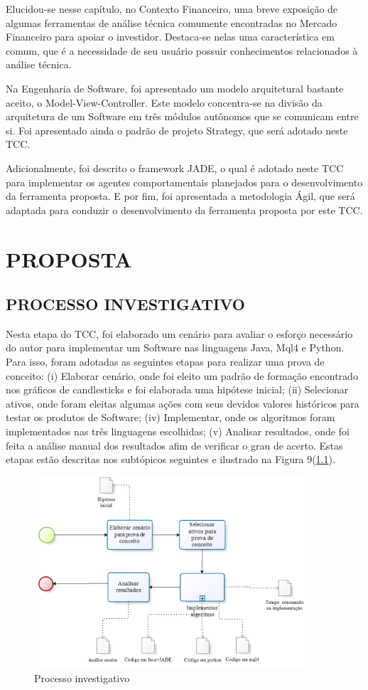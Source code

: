 Elucidou-se nesse capítulo, no Contexto Financeiro, uma breve exposição de algumas ferramentas de análise técnica comumente encontradas no Mercado Financeiro para apoiar o investidor. Destaca-se nelas uma característica em comum, que é a necessidade de seu usuário possuir conhecimentos relacionados à análise técnica. 

Na Engenharia de Software, foi apresentado um modelo arquitetural bastante aceito, o Model-View-Controller. Este modelo concentra-se na divisão da arquitetura de um Software em três módulos autônomos que se comunicam entre si. Foi apresentado ainda o padrão de projeto Strategy, que será adotado neste TCC. 

Adicionalmente, foi descrito o framework JADE, o qual é adotado neste TCC para implementar os agentes comportamentais planejados para o desenvolvimento da ferramenta proposta. E por fim, foi apresentada a metodologia Ágil, que será adaptada para conduzir o desenvolvimento da ferramenta proposta por este TCC.

\newpage
\chapter[PROPOSTA]{PROPOSTA}
\section{PROCESSO INVESTIGATIVO}
Nesta etapa do TCC, foi elaborado um cenário para avaliar o esforço necessário do autor para implementar um Software nas linguagens Java, Mql4 e Python. Para isso, foram adotadas as seguintes etapas para realizar uma prova de conceito: (i) Elaborar cenário, onde foi eleito um padrão de formação encontrado nos gráficos de candlesticks e foi elaborada uma hipótese inicial; (ii) Selecionar  ativos, onde foram eleitas algumas ações com seus devidos valores históricos para testar os produtos de  Software; (iv) Implementar, onde os algoritmos foram implementados nas três linguagens escolhidas; (v) Analisar resultados, onde foi feita a análise manual dos resultados afim de verificar o grau de acerto. Estas etapas estão descritas nos subtópicos seguintes e ilustrado na Figura 9(\ref{f09}).


\begin{figure}[h]
\centering
\label{f09}
\includegraphics[width=0.9\textwidth]{figuras/f09}
\caption{Processo investigativo }

\end{figure}
